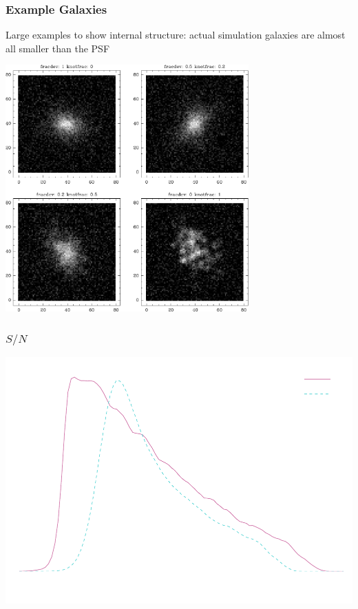 \documentclass{beamer}
\newcommand{\snr}{$S/N$}
\begin{document}
{

    \frame
    {
        \frametitle{Example Galaxies}
     
        {\small Large examples to show internal structure:  actual simulation
        galaxies are almost all smaller than the PSF }

        \begin{center}
            \includegraphics[width=0.7\textwidth]{mosaic-009086.pdf}
            \newline
        \end{center}

    }


}



\frame
{
    \frametitle{\snr}
 
    \begin{center}
        \includegraphics[width=\textwidth]{run-bdj03mcal01-s2n-inv.pdf}
        \newline
    \end{center}



}
\end{document}
